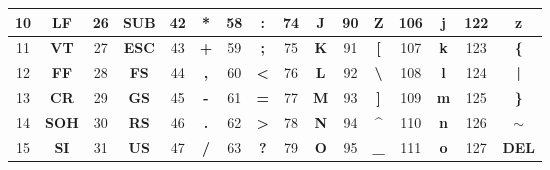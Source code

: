 \begin{table}[hbt!]
\begin{tabular}{|c|c|c|c|c|c|c|c|c|c|c|c|c|c|c|c|}
10 & \textbf{LF}  & 26 & \textbf{SUB} & 42 & *           & 58 & \textbf{:}              & 74 & \textbf{J} & 90 & \textbf{Z}                  & 106 & \textbf{j} & 122 & \textbf{z}      \\ \hline
11 & \textbf{VT}  & 27 & \textbf{ESC} & 43 & \textbf{+}  & 59 & \textbf{;}              & 75 & \textbf{K} & 91 & \textbf{{[}}                & 107 & \textbf{k} & 123 & \textbf{\{}     \\ \hline
12 & \textbf{FF}  & 28 & \textbf{FS}  & 44 & \textbf{,}  & 60 & \textbf{\textless{}}    & 76 & \textbf{L} & 92 & \textbf{\textbackslash{}}   & 108 & \textbf{l} & 124 & \textbf{|}      \\ \hline
13 & \textbf{CR}  & 29 & \textbf{GS}  & 45 & \textbf{-}  & 61 & \textbf{=}              & 77 & \textbf{M} & 93 & \textbf{{]}}                & 109 & \textbf{m} & 125 & \textbf{\}}     \\ \hline
14 & \textbf{SOH} & 30 & \textbf{RS}  & 46 & \textbf{.}  & 62 & \textbf{\textgreater{}} & 78 & \textbf{N} & 94 & \textbf{\textasciicircum{}} & 110 & \textbf{n} & 126 & \textbf{$\sim$} \\ \hline
15 & \textbf{SI}  & 31 & \textbf{US}  & 47 & \textbf{/}  & 63 & \textbf{?}              & 79 & \textbf{O} & 95 & \textbf{\_}                 & 111 & \textbf{o} & 127 & \textbf{DEL}    \\ \hline
\end{tabular}
\end{table}